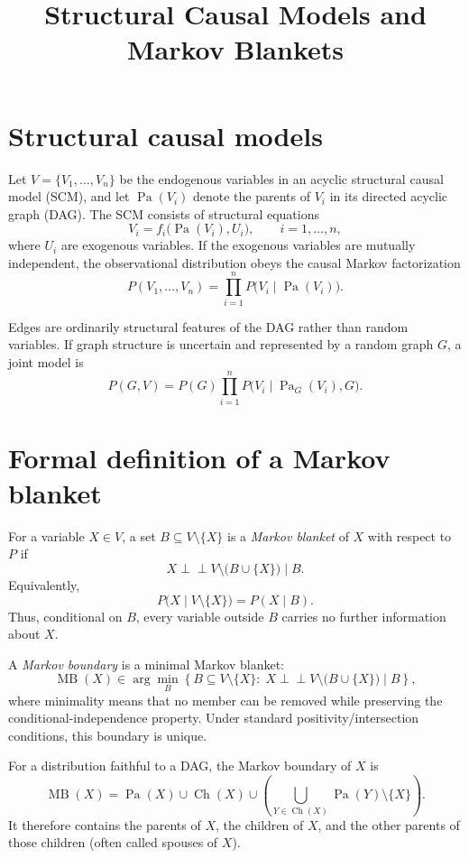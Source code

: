\documentclass[11pt]{article}
\title{Structural Causal Models and Markov Blankets}
\author{}
\date{}
\newcommand{\Pa}{\operatorname{Pa}}
\newcommand{\Ch}{\operatorname{Ch}}
\newcommand{\MB}{\operatorname{MB}}
\newcommand{\indep}{\perp\!\!\!\perp}
\begin{document}
\maketitle

\section{Structural causal models}

Let $V=\{V_1,\ldots,V_n\}$ be the endogenous variables in an acyclic
structural causal model (SCM), and let $\Pa(V_i)$ denote the parents of
$V_i$ in its directed acyclic graph (DAG). The SCM consists of structural
equations
\[
  V_i=f_i\bigl(\Pa(V_i),U_i\bigr), \qquad i=1,\ldots,n,
\]
where $U_i$ are exogenous variables. If the exogenous variables are mutually
independent, the observational distribution obeys the causal Markov
factorization
\[
  P(V_1,\ldots,V_n)=\prod_{i=1}^n P\bigl(V_i\mid\Pa(V_i)\bigr).
\]

Edges are ordinarily structural features of the DAG rather than random
variables. If graph structure is uncertain and represented by a random graph
$G$, a joint model is
\[
  P(G,V)=P(G)\prod_{i=1}^n P\bigl(V_i\mid\Pa_G(V_i),G\bigr).
\]

\section{Formal definition of a Markov blanket}

For a variable $X\in V$, a set $B\subseteq V\setminus\{X\}$ is a
\emph{Markov blanket} of $X$ with respect to $P$ if
\[
  X\indep V\setminus\bigl(B\cup\{X\}\bigr)\mid B.
\]
Equivalently,
\[
  P\bigl(X\mid V\setminus\{X\}\bigr)=P(X\mid B).
\]
Thus, conditional on $B$, every variable outside $B$ carries no further
information about $X$.

A \emph{Markov boundary} is a minimal Markov blanket:
\[
  \MB(X)\in\arg\min_B
  \left\{B\subseteq V\setminus\{X\}:\;
  X\indep V\setminus\bigl(B\cup\{X\}\bigr)\mid B\right\},
\]
where minimality means that no member can be removed while preserving the
conditional-independence property. Under standard positivity/intersection
conditions, this boundary is unique.

For a distribution faithful to a DAG, the Markov boundary of $X$ is
\[
  \MB(X)=\Pa(X)\cup\Ch(X)\cup
  \left(\bigcup_{Y\in\Ch(X)}\Pa(Y)\setminus\{X\}\right).
\]
It therefore contains the parents of $X$, the children of $X$, and the other
parents of those children (often called spouses of $X$).
\end{document}
